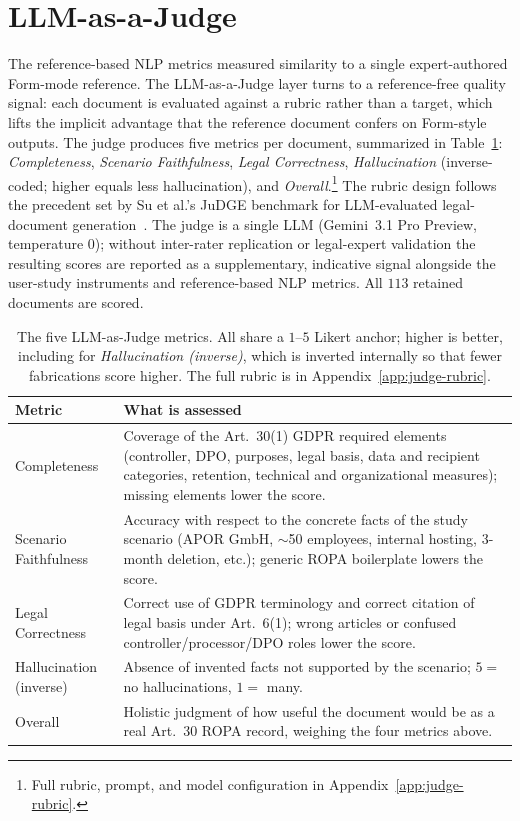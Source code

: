 \section{LLM-as-a-Judge}
\label{sec:eval-judge}

The reference-based NLP metrics measured similarity to a single
expert-authored Form-mode reference. The LLM-as-a-Judge layer
turns to a reference-free quality signal: each document is
evaluated against a rubric rather than a target, which lifts the
implicit advantage that the reference document confers on
Form-style outputs. The judge produces five metrics per document,
summarized in Table~\ref{tab:judge-metrics}: \emph{Completeness},
\emph{Scenario Faithfulness}, \emph{Legal Correctness},
\emph{Hallucination} (inverse-coded; higher equals less
hallucination), and \emph{Overall}.\footnote{Full rubric, prompt,
and model configuration in Appendix~\ref{app:judge-rubric}.}
The rubric design follows the precedent set by Su et al.'s JuDGE
benchmark for LLM-evaluated legal-document
generation~\cite{suJuDGEBenchmarkingJudgment2025}. The judge is a
single LLM (Gemini~3.1 Pro Preview, temperature $0$); without
inter-rater replication or legal-expert validation the resulting
scores are reported as a supplementary, indicative signal
alongside the user-study instruments and reference-based NLP
metrics. All $113$ retained documents are scored.

\begin{table}[htbp]
\centering
\small
\caption{The five LLM-as-Judge metrics. All share a $1$--$5$
Likert anchor; higher is better, including for
\emph{Hallucination (inverse)}, which is inverted internally so
that fewer fabrications score higher. The full rubric is in
Appendix~\ref{app:judge-rubric}.}
\label{tab:judge-metrics}
\begin{tabularx}{\textwidth}{@{}lX@{}}
\toprule
Metric & What is assessed \\
\midrule
Completeness            & Coverage of the Art.~30(1) GDPR required elements (controller, DPO, purposes, legal basis, data and recipient categories, retention, technical and organizational measures); missing elements lower the score. \\
\addlinespace
Scenario Faithfulness   & Accuracy with respect to the concrete facts of the study scenario (APOR GmbH, $\sim$50 employees, internal hosting, 3-month deletion, etc.); generic ROPA boilerplate lowers the score. \\
\addlinespace
Legal Correctness       & Correct use of GDPR terminology and correct citation of legal basis under Art.~6(1); wrong articles or confused controller/processor/DPO roles lower the score. \\
\addlinespace
Hallucination (inverse) & Absence of invented facts not supported by the scenario; $5 =$ no hallucinations, $1 =$ many. \\
\addlinespace
Overall                 & Holistic judgment of how useful the document would be as a real Art.~30 ROPA record, weighing the four metrics above. \\
\bottomrule
\end{tabularx}
\end{table}

